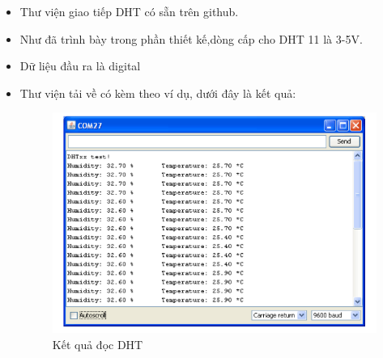 \documentclass[a4paper,12pt,oneside]{article}
\begin{document}
\begin{itemize}
\begin{itemize}
\item Thư viện giao tiếp DHT có sẵn trên github.
\item Như đã trình bày trong phần thiết kế,dòng cấp cho DHT 11 là 3-5V.
\item Dữ liệu đầu ra là digital
\item Thư viện tải về có kèm theo ví dụ, dưới đây là kết quả:
\begin{center}
\begin{figure}[h!]
\begin{center}
\includegraphics[scale=0.4]{hinh/dhtexample.png}
\end{center}
\caption{Kết quả đọc DHT}
\end{figure}
\end{center}
\end{itemize}

\end{itemize}
\end{document}
